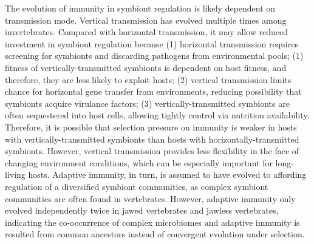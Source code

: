 \documentclass[11pt]{article}
\begin{document}
\begin{sloppypar}
The evolution of immunity in symbiont regulation is likely dependent on transmission mode. 
Vertical transmission has evolved multiple times among invertebrates. 
Compared with horizontal transmission, it may allow reduced investment in symbiont regulation because 
(1) horizontal transmission requires screening for symbionts and discarding pathogens from environmental pools; 
(1) fitness of vertically-transmitted symbionts is dependent on host fitness, and therefore, they are less likely to exploit hosts; 
(2) vertical transmission limits chance for horizontal gene transfer from environments, reducing possibility that symbionts acquire virulance factors; 
(3) vertically-transmitted symbionts are often sequestered into host cells, allowing tightly control via nutrition availability. 
Therefore, it is possible that selection pressure on immunity is weaker in hosts with vertically-transmitted symbionts than hosts with horizontally-transmitted symbionts. 
However, vertical transmission provides less flexibility in the face of changing environment conditions, which can be especially important for long-living hosts. 
Adaptive immunity, in turn, is assumed to have evolved to affording regulation of a diversified symbiont communities, as complex symbiont communities are often found in vertebrates. 
However, adaptive immunity only evolved independently twice in jawed vertebrates and jawless vertebrates, indicating the co-occurrence of complex microbiomes and adaptive immunity is resulted from common ancestors instead of convergent evolution under selection. 


\end{sloppypar}
\end{document}
